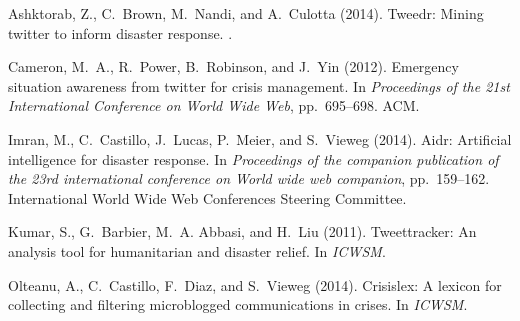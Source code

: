\documentclass{ewic}
\begin{document}
\begin{thebibliography}{9}

%
%

Ashktorab, Z., C.~Brown, M.~Nandi, and A.~Culotta (2014).
\newblock Tweedr: Mining twitter to inform disaster response.
.

Cameron, M.~A., R.~Power, B.~Robinson, and J.~Yin (2012).
\newblock Emergency situation awareness from twitter for crisis management.
\newblock In {\em Proceedings of the 21st International Conference on World
	Wide Web}, pp.\  695--698. ACM.

Imran, M., C.~Castillo, J.~Lucas, P.~Meier, and S.~Vieweg (2014).
\newblock Aidr: Artificial intelligence for disaster response.
\newblock In {\em Proceedings of the companion publication of the 23rd
	international conference on World wide web companion}, pp.\  159--162.
International World Wide Web Conferences Steering Committee.

Kumar, S., G.~Barbier, M.~A. Abbasi, and H.~Liu (2011).
\newblock Tweettracker: An analysis tool for humanitarian and disaster relief.
\newblock In {\em ICWSM}.

Olteanu, A., C.~Castillo, F.~Diaz, and S.~Vieweg (2014).
\newblock Crisislex: A lexicon for collecting and filtering microblogged
communications in crises.
\newblock In {\em ICWSM}.

\end{thebibliography}
\end{document}
